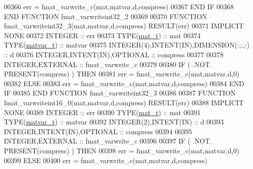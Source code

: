 \begin{DoxyCode}
00366         err = fmat\_varwrite\_c(mat,matvar,d,compress)
00367 \textcolor{keywordflow}{    END IF}
00368 \textcolor{keyword}{END FUNCTION }fmat\_varwriteint32\_2
00369 
00370 \textcolor{keyword}{FUNCTION }fmat\_varwriteint32\_3(mat,matvar,d,compress) \textcolor{keyword}{RESULT}(err)
00371 \textcolor{keywordtype}{IMPLICIT NONE}
00372     \textcolor{keywordtype}{INTEGER}                                  :: err
00373     \textcolor{keywordtype}{TYPE}(\hyperlink{group___m_a_t_gab0fc888f5a5d79943b16284b1f91c2e8}{mat\_t})                              :: mat
00374     \textcolor{keywordtype}{TYPE}(\hyperlink{group___m_a_t_structmatvar__t}{matvar\_t})                           :: matvar
00375     \textcolor{keywordtype}{INTEGER(4)},\textcolor{keywordtype}{INTENT(IN)},\textcolor{keywordtype}{DIMENSION(:,:,:)}   :: d
00376     \textcolor{keywordtype}{INTEGER},\textcolor{keywordtype}{INTENT(IN)},\textcolor{keywordtype}{OPTIONAL}              :: compress
00377 
00378     \textcolor{keywordtype}{INTEGER},\textcolor{keywordtype}{EXTERNAL}                         :: fmat\_varwrite\_c
00379 
00380     \textcolor{keywordflow}{IF} ( .NOT. \textcolor{keyword}{PRESENT}(compress) ) \textcolor{keywordflow}{THEN}
00381         err = fmat\_varwrite\_c(mat,matvar,d,0)
00382     \textcolor{keywordflow}{ELSE}
00383         err = fmat\_varwrite\_c(mat,matvar,d,compress)
00384 \textcolor{keywordflow}{    END IF}
00385 \textcolor{keyword}{END FUNCTION }fmat\_varwriteint32\_3
00386 
00387 \textcolor{keyword}{FUNCTION }fmat\_varwriteint16\_0(mat,matvar,d,compress) \textcolor{keyword}{RESULT}(err)
00388 \textcolor{keywordtype}{IMPLICIT NONE}
00389     \textcolor{keywordtype}{INTEGER}                                  :: err
00390     \textcolor{keywordtype}{TYPE}(\hyperlink{group___m_a_t_gab0fc888f5a5d79943b16284b1f91c2e8}{mat\_t})                              :: mat
00391     \textcolor{keywordtype}{TYPE}(\hyperlink{group___m_a_t_structmatvar__t}{matvar\_t})                           :: matvar
00392     \textcolor{keywordtype}{INTEGER(2)},\textcolor{keywordtype}{INTENT(IN)}                    :: d
00393     \textcolor{keywordtype}{INTEGER},\textcolor{keywordtype}{INTENT(IN)},\textcolor{keywordtype}{OPTIONAL}              :: compress
00394 
00395     \textcolor{keywordtype}{INTEGER},\textcolor{keywordtype}{EXTERNAL}                         :: fmat\_varwrite\_c
00396 
00397     \textcolor{keywordflow}{IF} ( .NOT. \textcolor{keyword}{PRESENT}(compress) ) \textcolor{keywordflow}{THEN}
00398         err = fmat\_varwrite\_c(mat,matvar,d,0)
00399     \textcolor{keywordflow}{ELSE}
00400         err = fmat\_varwrite\_c(mat,matvar,d,compress)

\end{DoxyCode}
